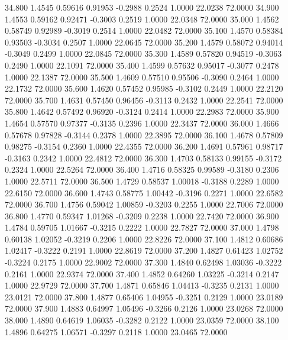   34.800   1.4545   0.59616   0.91953  -0.2988   0.2524   1.0000  22.0238  72.0000
  34.900   1.4553   0.59162   0.92471  -0.3003   0.2519   1.0000  22.0348  72.0000
  35.000   1.4562   0.58749   0.92989  -0.3019   0.2514   1.0000  22.0482  72.0000
  35.100   1.4570   0.58384   0.93503  -0.3034   0.2507   1.0000  22.0645  72.0000
  35.200   1.4579   0.58072   0.94014  -0.3049   0.2499   1.0000  22.0845  72.0000
  35.300   1.4589   0.57820   0.94519  -0.3063   0.2490   1.0000  22.1091  72.0000
  35.400   1.4599   0.57632   0.95017  -0.3077   0.2478   1.0000  22.1387  72.0000
  35.500   1.4609   0.57510   0.95506  -0.3090   0.2464   1.0000  22.1732  72.0000
  35.600   1.4620   0.57452   0.95985  -0.3102   0.2449   1.0000  22.2120  72.0000
  35.700   1.4631   0.57450   0.96456  -0.3113   0.2432   1.0000  22.2541  72.0000
  35.800   1.4642   0.57492   0.96920  -0.3124   0.2414   1.0000  22.2983  72.0000
  35.900   1.4654   0.57570   0.97377  -0.3135   0.2396   1.0000  22.3437  72.0000
  36.000   1.4666   0.57678   0.97828  -0.3144   0.2378   1.0000  22.3895  72.0000
  36.100   1.4678   0.57809   0.98275  -0.3154   0.2360   1.0000  22.4355  72.0000
  36.200   1.4691   0.57961   0.98717  -0.3163   0.2342   1.0000  22.4812  72.0000
  36.300   1.4703   0.58133   0.99155  -0.3172   0.2324   1.0000  22.5264  72.0000
  36.400   1.4716   0.58325   0.99589  -0.3180   0.2306   1.0000  22.5711  72.0000
  36.500   1.4729   0.58537   1.00018  -0.3188   0.2289   1.0000  22.6150  72.0000
  36.600   1.4743   0.58775   1.00442  -0.3196   0.2271   1.0000  22.6582  72.0000
  36.700   1.4756   0.59042   1.00859  -0.3203   0.2255   1.0000  22.7006  72.0000
  36.800   1.4770   0.59347   1.01268  -0.3209   0.2238   1.0000  22.7420  72.0000
  36.900   1.4784   0.59705   1.01667  -0.3215   0.2222   1.0000  22.7827  72.0000
  37.000   1.4798   0.60138   1.02052  -0.3219   0.2206   1.0000  22.8226  72.0000
  37.100   1.4812   0.60686   1.02417  -0.3222   0.2191   1.0000  22.8619  72.0000
  37.200   1.4827   0.61423   1.02752  -0.3224   0.2175   1.0000  22.9002  72.0000
  37.300   1.4840   0.62498   1.03036  -0.3222   0.2161   1.0000  22.9374  72.0000
  37.400   1.4852   0.64260   1.03225  -0.3214   0.2147   1.0000  22.9729  72.0000
  37.700   1.4871   0.65846   1.04413  -0.3235   0.2131   1.0000  23.0121  72.0000
  37.800   1.4877   0.65406   1.04955  -0.3251   0.2129   1.0000  23.0189  72.0000
  37.900   1.4883   0.64997   1.05496  -0.3266   0.2126   1.0000  23.0268  72.0000
  38.000   1.4890   0.64619   1.06035  -0.3282   0.2122   1.0000  23.0359  72.0000
  38.100   1.4896   0.64275   1.06571  -0.3297   0.2118   1.0000  23.0465  72.0000
